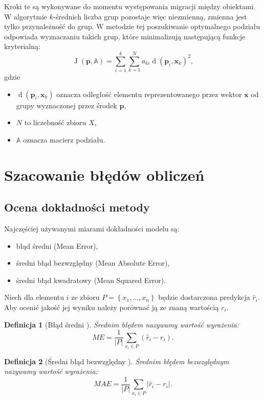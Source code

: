\documentclass[12pt,a4paper]{report}
\newtheorem{df}{Definicja}[chapter]
\newcommand{\set}[1]{\left\lbrace {#1} \right\rbrace}
\newcommand{\J}[2]{\operatorname{J}\left({#1}, {#2} \right)}
\newcommand{\distance}[2]{\operatorname{d}\left({#1}, {#2} \right)}
\begin{document}
Kroki te są wykonywane do momentu występowania migracji między obiektami.
W algorytmie $k$-średnich liczba grup pozostaje więc niezmienną, zmienna jest tylko przynależność do grup.
W metodzie tej poszukiwanie optymalnego podziału odpowiada wyznaczaniu takich grup, które minimalizują następującą funkcje kryterialną:
$$
\J{\mathbf{p}}{\mathbb{A}} = \sum_{i=1}^k \sum_{k=1}^N a_{ki}\distance{\mathbf{p}_i}{\mathbf{x}_k}^2,
$$
gdzie 
\begin{itemize}
\item $\distance{\mathbf{p}_i}{\mathbf{x}_k}$ oznacza odległość elementu reprezentowanego przez wektor $\mathbf{x}$ od grupy wyznaczonej przez środek $\mathbf{p}$,
\item $N$ to liczebność zbioru $\mathit{X}$,
\item $\mathbb{A}$ oznacza macierz podziału.
\end{itemize}
 
\section{Szacowanie błędów obliczeń}
\subsection{Ocena dokładności metody}%
Najczęściej używanymi miarami dokładności modelu są:
\begin{itemize}
\item błąd średni (Mean Error),
\item średni błąd bezwzględny (Mean Absolute Error),
\item średni błąd kwadratowy (Mean Squared Error).
\end{itemize}

Niech dla elementu $i$ ze zbioru $\mathit{P} = \set{x_1, \ldots, x_n}$ będzie dostarczona predykcja $\widehat{r}_i$. Aby ocenić jakość jej wyniku należy porównać ją ze znaną wartością $r_i$.

\begin{df}[Błąd średni {\citep[Sec 4.1.1]{rsh}}]
Średnim błędem nazywamy wartość wyrażenia:
$$
ME = \frac{1}{|\mathit{P}|}\sum_{x_i \in \mathit{P}}(\widehat{r}_i-r_i).
$$
\end{df}

\begin{df}[Średni błąd bezwzględny  {\citep[Sec 4.1.1]{rsh}}]
Średnim błędem bezwzględnym nazywamy wartość wyrażenia:
$$
MAE = \frac{1}{|\mathit{P}|}\sum_{x_i \in \mathit{P}}|\widehat{r}_i-r_i|.
$$
\end{df}
\end{document}
